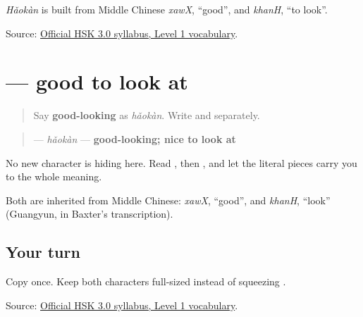 \emph{Hǎokàn} is built from Middle Chinese \emph{xawX}, \textquotedblleft{}good\textquotedblright{}, and \emph{khanH}, \textquotedblleft{}to look\textquotedblright{}.

\begin{tcolorbox}[breakable,colback=teal!4,colframe=teal!35!black,title={Before you move on}]
Source: \href{https://hsk.cn-bj.ufileos.com/3.0/\%E6\%96\%B0\%E7\%89\%88HSK\%E8\%80\%83\%E8\%AF\%95\%E5\%A4\%A7\%E7\%BA\%B21219.pdf}{Official HSK 3.0 syllabus, Level 1 vocabulary}.
\end{tcolorbox}
\section[\texorpdfstring{\zh{好看} (hǎokàn)}{好看 (hǎokàn)}]{ — good to look at}

\label{lesson:ZH-C18-haokan}



\begin{quote}
Say \textbf{good-looking} as \emph{hǎokàn}. Write  and  separately.
\end{quote}

\begin{cousinweb}
\begin{quote}
\textbf{} — \emph{hǎokàn} — \textbf{good-looking; nice to look at}
\end{quote}

No new character is hiding here. Read , then , and let the literal pieces carry you to the whole meaning.

Both are inherited from Middle Chinese: \emph{xawX}, \textquotedblleft{}good\textquotedblright{}, and \emph{khanH}, \textquotedblleft{}look\textquotedblright{} (Guangyun, in Baxter's transcription).
\end{cousinweb}

\subsection*{Your turn}
Copy \textbf{} once. Keep both characters full-sized instead of squeezing .

\begin{tcolorbox}[breakable,colback=teal!4,colframe=teal!35!black,title={Before you move on}]
Source: \href{https://hsk.cn-bj.ufileos.com/3.0/\%E6\%96\%B0\%E7\%89\%88HSK\%E8\%80\%83\%E8\%AF\%95\%E5\%A4\%A7\%E7\%BA\%B21219.pdf}{Official HSK 3.0 syllabus, Level 1 vocabulary}.
\end{tcolorbox}
